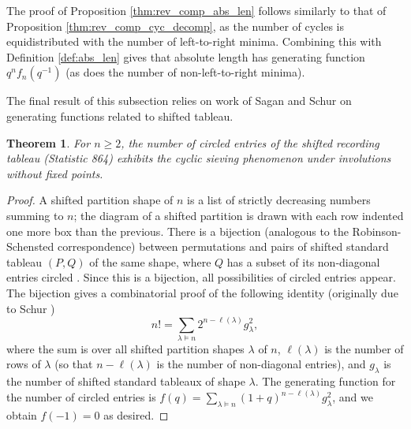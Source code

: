 \documentclass{amsart}
\newtheorem{thm}{Theorem}[section]
\theoremstyle{definition}
\begin{document}
The proof of Proposition \ref{thm:rev_comp_abs_len} follows similarly to that of Proposition \ref{thm:rev_comp_cyc_decomp}, as the number of cycles  is equidistributed with the number of left-to-right minima. Combining this with Definition \ref{def:abs_len} gives that absolute length has 
generating function $q^n f_n(q^{-1})$ (as does the number of non-left-to-right minima).

The final result of this subsection relies on work of Sagan \cite{Sagan1987} and Schur \cite{Schur1911} on generating functions related to shifted tableau.


\begin{thm}\label{circled_shifted}
  For $n \geq 2$, the number of circled entries of the shifted recording tableau \textnormal{(Statistic 864)} exhibits the cyclic sieving phenomenon under involutions without fixed points.
\end{thm}
\begin{proof}
  A shifted partition shape of $n$ is a list of strictly decreasing numbers summing to $n$; the diagram of a shifted partition is drawn with each row indented one more box than the previous. There is a bijection (analogous to the Robinson-Schensted correspondence) between permutations and pairs of shifted standard tableau $(P,Q)$ of the same shape, where $Q$ has a subset of its non-diagonal entries circled \cite[Theorem 3.1]{Sagan1987}. Since this is a bijection, all possibilities of circled entries appear. The bijection gives a combinatorial proof of the following identity \cite[Corollary 3.2]{Sagan1987} (originally due to Schur \cite{Schur1911})
  \[n!=\sum_{\lambda\models n}2^{n-\ell(\lambda)}g_{\lambda}^2,\]
  where the sum is over all shifted partition shapes $\lambda$ of $n$, $\ell(\lambda)$ is the number of rows of $\lambda$ (so that $n-\ell(\lambda)$ is the number of non-diagonal entries), and $g_{\lambda}$ is the number of shifted standard tableaux of shape $\lambda$.
  The generating function for the number of circled entries is
  $f(q)=\sum_{\lambda\models n}(1+q)^{n-\ell(\lambda)}g_{\lambda}^2$,
  and we obtain $f(-1)=0$ as desired.
\end{proof}
\end{document}
